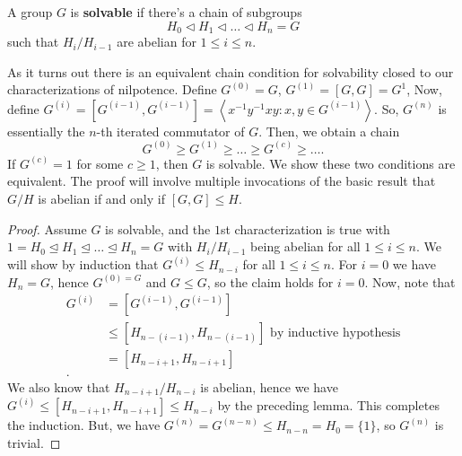 \begin{definition}
	A group \(G\) is \textbf{solvable} if there's a chain  of subgroups \[
	H_0 \triangleleft H_1 \triangleleft \ldots \triangleleft H_{n} = G
	\] such that \(H_{i} / H_{ i -1}\) are abelian for \(1 \le i \le n\).
\end{definition}
As it turns out there is an equivalent chain condition for solvability closed to our characterizations of nilpotence.
Define \(G^{\left( 0 \right) } = G\), \(G^{\left( 1 \right) } = \left[ G, G \right]  = G^{1}\), Now, define \(G^{\left( i \right) } = \left[ G^{\left( i-1 \right) }, G^{\left( i-1 \right) } \right] = \left<x^{-1}y^{-1}xy : x, y \in G^{\left( i-1 \right) } \right>  \). So, \(G^{\left( n \right) }\) is essentially the \(n\)-th iterated commutator of \(G\). Then, we obtain a chain \[
	G^{\left( 0 \right) }\ge G^{\left( 1 \right) } \ge \ldots \ge G^{\left( c \right) } \ge \ldots
.\]
If \(G^{\left( c \right) } = 1\) for some \(c \ge 1\), then \(G\) is solvable. We show these two conditions are equivalent. The proof will involve multiple invocations of the basic result that \(G / H\) is abelian if and only if \(\left[ G, G \right]  \le H\).
\begin{proof}
	Assume \(G\) is solvable, and the \(1\)st characterization is true with \(1 = H_0 \trianglelefteq H_1 \trianglelefteq \ldots \trianglelefteq H_{n} = G\) with \(H_{i} / H_{ i -1}\) being abelian for all \(1 \le i \le n\). We will show by induction that \(G^{\left( i \right) }\le H_{n - i}\) for all \(1\le i \le n\). For \( i = 0\) we have \(H_{n} = G\), hence \(G^{\left( 0 \right) = G}\) and \(G \le G\), so the claim holds for \(i = 0\). Now, note that
	\begin{align*}
		G^{\left( i \right) } &= \left[ G^{\left( i - 1 \right) }, G^{\left( i - 1 \right) } \right] \\
				      &\le \left[ H_{n - \left( i - 1 \right) }, H_{n - \left( i - 1 \right) } \right] \text{ by inductive hypothesis} \\
				      &= \left[ H_{ n - i + 1}, H_{n - i + 1} \right]  \\
	.\end{align*}
	We also know that \(H_{ n - i + 1} / H_{ n - i}\) is abelian, hence we have \(G^{\left( i \right) } \le \left[H_{ n - i + 1}, H_{n - i + 1}  \right] \le H_{n - i} \) by the preceding lemma. This completes the induction. But, we have \(G^{\left( n \right) } = G^{\left( n - n \right) } \le H_{n - n } = H_0 = \{1\} \), so \(G^{\left( n \right) }\) is trivial.
\end{proof}
